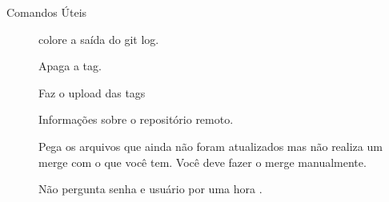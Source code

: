 \begin{frame}[fragile]{Comandos Úteis}
\begin{description}
		\item[\color{red}] colore a saída do git log.
		\item[] Apaga a tag.
		\item[ ] Faz o upload das tags
		\item[] Informações sobre o repositório remoto.
		\item[] Pega os arquivos que ainda não foram atualizados mas não realiza um merge com o que você tem. Você deve fazer o merge manualmente.
        \item[] Não pergunta senha e usuário por uma hora .
\end{description}
\end{frame}
